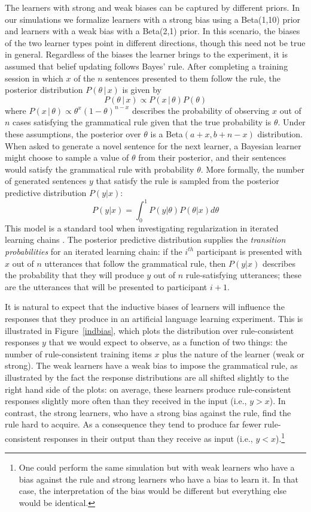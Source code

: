 \documentclass[doc]{apa6}
\newcommand{\given}{\, | \,}
\begin{document}
The learners with {\sc strong} and {\sc weak} biases can be captured by different priors. In our simulations we formalize learners with a {\sc strong} bias using a Beta(1,10) prior and learners with a {\sc weak} bias with a Beta(2,1) prior. In this scenario, the biases of the two learner types point in different directions, though this need not be true in general.  Regardless of the biases the learner brings to the experiment, it is assumed that belief updating follows Bayes' rule. After completing a training session in which $x$ of the $n$ sentences presented to them follow the rule, the posterior distribution $P(\theta \given x)$ is given by
$$
P(\theta \given x) \propto P(x \given \theta) P(\theta)
$$
where $P(x \given \theta) \propto \theta^x (1-\theta)^{n-x}$ describes the probability of observing $x$ out of $n$ cases satisfying the grammatical rule given that the true probability is $\theta$. Under these assumptions, the posterior over $\theta$ is a Beta$(a+x,b+n-x)$ distribution. When asked to generate a novel sentence for the next learner, a Bayesian learner might choose to sample a value of $\theta$ from their posterior, and their sentences would satisfy the grammatical rule with probability $\theta$. More formally, the number of generated sentences $y$ that satisfy the rule is sampled from the posterior predictive distribution $P(y|x)$:
$$
P(y|x) = \int_0^1 P(y|\theta) P(\theta|x) d\theta
$$
This model is a standard tool when investigating regularization in iterated learning chains \parencite{realigriffiths09,ferdinandetal13}. The posterior predictive distribution supplies the {\it transition probabilities} for an iterated learning chain: if the $i^{th}$ participant is presented with $x$ out of $n$ utterances that follow the grammatical rule, then $P(y|x)$ describes the probability that they will produce $y$ out of $n$ rule-satisfying utterances; these are the utterances that will be presented to participant $i+1$. 

It is natural to expect that the inductive biases of learners will influence the responses that they produce in an artificial language learning experiment. This is illustrated in Figure~\ref{indbias}, which plots the distribution over rule-consistent responses $y$ that we would expect to observe, as a function of two things: the number of rule-consistent training items $x$ plus the nature of the learner ({\sc weak} or {\sc strong}). The {\sc weak} learners have a weak bias to impose the grammatical rule, as illustrated by the fact the response distributions are all shifted slightly to the right hand side of the plots: on average, these learners produce rule-consistent responses slightly more often than they received in the input (i.e., $y>x$). In contrast, the {\sc strong} learners, who have a strong bias against the rule, find the rule hard to acquire. As a consequence they tend to produce far fewer rule-consistent responses in their output than they receive as input (i.e., $y<x$).\footnote{One could perform the same simulation but with {\sc weak} learners who have a bias against the rule and {\sc strong} learners who have a bias to learn it. In that case, the interpretation of the bias would be different but everything else would be identical.}
\end{document}

